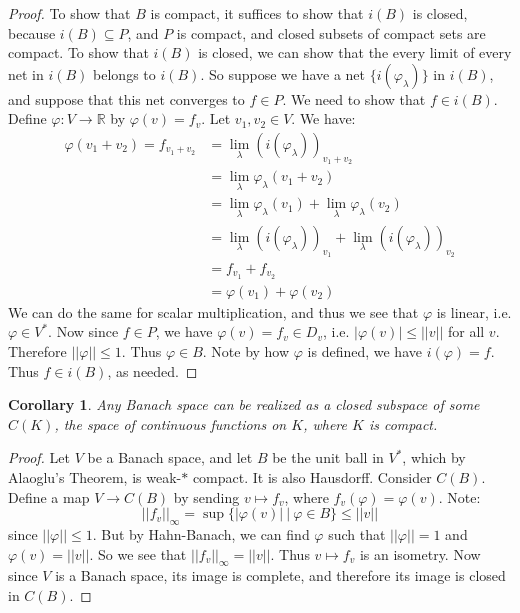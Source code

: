 \documentclass[a4paper,12pt]{report}
\newcommand{\sse} {\subseteq}
\newcommand{\vphi} {\varphi}
\newtheorem{corollary}[theorem]{Corollary}
\begin{document}
\begin{proof}
	To show that $B$ is compact, it suffices to show that $i(B)$ is closed, because $i(B) \sse P$, and $P$ is compact, and closed subsets of compact sets are compact. To show that $i(B)$ is closed, we can show that the every limit of every net in $i(B)$ belongs to $i(B)$. So suppose we have a net $\{i(\vphi_{\lambda})\}$ in $i(B)$, and suppose that this net converges to $f \in P$. We need to show that $f \in i(B)$. Define $\varphi : V \rightarrow \mathbb{R}$ by $\varphi(v) = f_v$. Let $v_1, v_2 \in V$. We have:
	\begin{align*}
	\varphi(v_1 + v_2) = f_{v_1 + v_2} &= \lim_\lambda (i(\vphi_\lambda))_{v_1 + v_2} \\
	&= \lim_\lambda \vphi_\lambda(v_1 + v_2) \\
	&= \lim_\lambda \vphi_\lambda(v_1) + \lim_\lambda \vphi_\lambda(v_2) \\
	&= \lim_\lambda (i(\vphi_\lambda))_{v_1} + \lim_\lambda (i(\vphi_\lambda))_{v_2} \\
	&= f_{v_1} + f_{v_2} \\
	&= \varphi(v_1) + \varphi(v_2)
	\end{align*}
	We can do the same for scalar multiplication, and thus we see that $\varphi$ is linear, i.e. $\varphi \in V^*$. Now since $f \in P$, we have $\varphi(v) = f_v \in D_v$, i.e. $|\varphi(v)| \leq ||v||$ for all $v$. Therefore $||\varphi|| \leq 1$. Thus $\varphi \in B$. Note by how $\varphi$ is defined, we have $i(\varphi) = f$. Thus $f \in i(B)$, as needed.
	\end{proof}
	
	\begin{corollary}
	Any Banach space can be realized as a closed subspace of some $C(K)$, the space of continuous functions on $K$, where $K$ is compact.
	\end{corollary}
	\begin{proof}
	Let $V$ be a Banach space, and let $B$ be the unit ball in $V^*$, which by Alaoglu's Theorem, is weak-$\ast$ compact. It is also Hausdorff. Consider $C(B)$. Define a map $V \rightarrow C(B)$ by sending $v \mapsto f_v$, where $f_v(\vphi) = \vphi(v)$. Note:
	\[ ||f_v||_\infty = \sup \big\{ |\vphi(v)| ~|~ \vphi \in B \big\} \leq ||v|| \]
	since $||\vphi|| \leq 1$. But by Hahn-Banach, we can find $\vphi$ such that $||\vphi|| = 1$ and $\vphi(v) = ||v||$. So we see that $||f_v||_\infty = ||v||$. Thus $v \mapsto f_v$ is an isometry. Now since $V$ is a Banach space, its image is complete, and therefore its image is closed in $C(B)$. 
	\end{proof}
	
\end{document}
